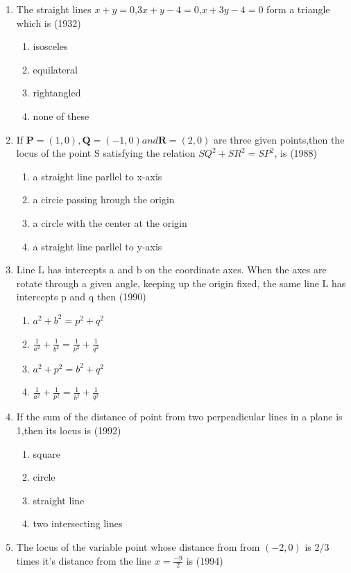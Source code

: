 \documentclass[12pt]{article}
\let\vec\mathbf
\begin{document}
\begin{enumerate}
\item The straight lines $x+y=0$,$3x+y-4=0$,$x+3y-4=0$ form a triangle which is (1932)
\begin{enumerate}
\item isosceles
\item equilateral
\item rightangled
\item none of these
\end{enumerate}
\item If $\vec{P}=(1,0),\vec{Q}=(-1,0) and \vec{R}=(2,0)$ are three given points,then the locus of the point S satisfying the relation $SQ^2+SR^2=SP^2$, is (1988)
\begin{enumerate}
\item a straight line parllel to x-axis  
\item a circie passing hrough the origin 
\item a circle with the center at the origin 
\item a straight line parllel to y-axis
\end{enumerate}
\item Line L has intercepts a and b on the coordinate axes. When the axes are rotate through a given angle, keeping up the origin fixed, the same line L has intercepts  p and q then (1990)\\
\begin{enumerate}
\item $a^2+b^2=p^2+q^2$ 
\item $\frac{1}{a^2} +\frac{1}{b^2}=\frac{1}{p^2}+\frac{1}{q^2}$ 
\item $a^2+p^2=b^2+q^2$ 
\item $\frac{1}{a^2}+\frac{1}{p^2}=\frac{1}{b^2}+\frac{1}{q^2}$
\end{enumerate}
\item If the sum of the distance of point from two perpendicular lines in a plane is 1,then its locus is (1992)\\
\begin{enumerate}
\item square 
\item circle 
\item straight line  
\item two intersecting lines
\end{enumerate}
\item The locus of the variable point whose distance from from $(-2,0)$ is $2/3$ times it's distance from the line $x= \frac{-9}{2}$ is (1994)
\begin{enumerate}

\end{enumerate}
\end{enumerate}
\end{document}
